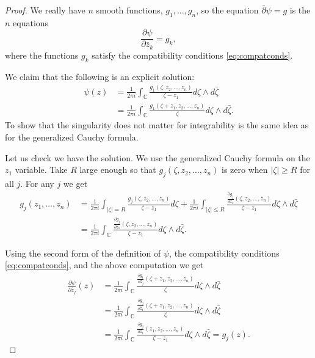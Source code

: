 \documentclass[12pt,openany]{book}
\newcommand{\sabs}[1]{\lvert {#1} \rvert}
\newcommand{\abs}[1]{\left\lvert {#1} \right\rvert}
\newcommand{\C}{{\mathbb{C}}}
\theoremstyle{plain}
\theoremstyle{remark}
\theoremstyle{definition}
\theoremstyle{exercise}
\theoremstyle{example}
\begin{document}
\begin{proof}
We really have $n$ 
smooth functions, $g_1,\ldots,g_n$, so the equation $\bar{\partial} \psi = g$
is the $n$ equations
\begin{equation*}
\frac{\partial \psi}{\partial \bar{z}_k} = g_k ,
\end{equation*}
where the functions $g_k$ satisfy the compatibility conditions
\eqref{eq:compatconds}.

We claim that the following is an explicit solution:
\begin{equation*}
\begin{split}
\psi(z)
& =
\frac{1}{2\pi i}
\int_\C
\frac{
 g_1(\zeta,z_2,\ldots,z_n)
}{\zeta - z_1}
d\zeta \wedge d\bar{\zeta}
\\
& =
\frac{1}{2\pi i}
\int_\C
\frac{
 g_1(\zeta+z_1,z_2,\ldots,z_n)
}{\zeta}
d\zeta \wedge d\bar{\zeta} .
\end{split}
\end{equation*}
To show that the singularity does not matter for integrability is the same
idea as for the generalized Cauchy formula.

Let us check we have the solution.
We use the generalized Cauchy formula on the $z_1$
variable.
Take $R$ large enough so that 
$g_j(\zeta,z_2,\ldots,z_n)$ is zero when $\sabs{\zeta}\geq R$ for all $j$.
For any $j$ we get
\begin{equation*}
\begin{split}
g_j(z_1,\ldots,z_n) & =
\frac{1}{2\pi i}
\int_{\abs{\zeta}=R}
\frac{g_j(\zeta,z_2,\ldots,z_n)}{\zeta-z_1}
d \zeta
+
\frac{1}{2\pi i}
\int_{\abs{\zeta} \leq R}
\frac{\frac{\partial g_j}{\partial \bar{z}_1}(\zeta,z_2,\ldots,z_n)}{\zeta-z_1}
d\zeta \wedge d\bar{\zeta} 
\\
& =
\frac{1}{2\pi i}
\int_{\C}
\frac{\frac{\partial g_j}{\partial \bar{z}_1}(\zeta,z_2,\ldots,z_n)}{\zeta-z_1}
d\zeta \wedge d\bar{\zeta}  .
\end{split}
\end{equation*}

Using the second form of the definition of $\psi$, the
compatibility conditions \eqref{eq:compatconds}, and the above computation we get
\begin{equation*} 
\begin{split}
\frac{\partial\psi}{\partial \bar{z}_j}(z)
& =
\frac{1}{2\pi i}
\int_\C
\frac{
 \frac{\partial g_1}{\partial \bar{z}_j}(\zeta+z_1,z_2,\ldots,z_n)
}{\zeta}
d\zeta \wedge d\bar{\zeta} 
\\
& =
\frac{1}{2\pi i}
\int_\C
\frac{
 \frac{\partial g_j}{\partial \bar{z}_1}(\zeta+z_1,z_2,\ldots,z_n)
}{\zeta}
d\zeta \wedge d\bar{\zeta} 
\\
& =
\frac{1}{2\pi i}
\int_\C
\frac{
 \frac{\partial g_j}{\partial \bar{z}_1}(z_1,z_2,\ldots,z_n)
}{\zeta-z_1}
d\zeta \wedge d\bar{\zeta} 
=
g_j(z) .
\end{split}
\end{equation*}


\end{proof}
\end{document}
